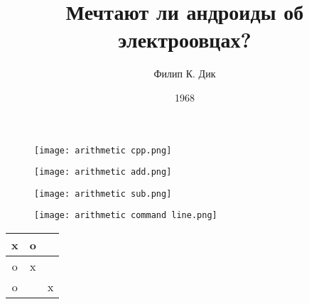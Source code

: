 \documentclass[a4paper,12pt]{article}
\title{Мечтают ли андроиды об электроовцах?}
\author{Филип К. Дик}
\date{1968}
\begin{document}
\begin{figure}[h] %
		\centering
			\texttt{[image: arithmetic cpp.png]}
\end{figure}


\begin{figure}[h] %
		\centering
			\texttt{[image: arithmetic add.png]}
\end{figure}


\begin{figure}[h] %
		\centering
			\texttt{[image: arithmetic sub.png]}
\end{figure}


\begin{figure}[h] %
		\centering
			\texttt{[image: arithmetic command line.png]}
\end{figure}

\begin{table}[h] %
  \centering
  \begin{tabular}{|c|c|c|}
  \hline
  x & o &  \\ \hline
  o & x &  \\ \hline
  o &  & x \\ \hline
  \end{tabular}
\end{table}
\end{document}
